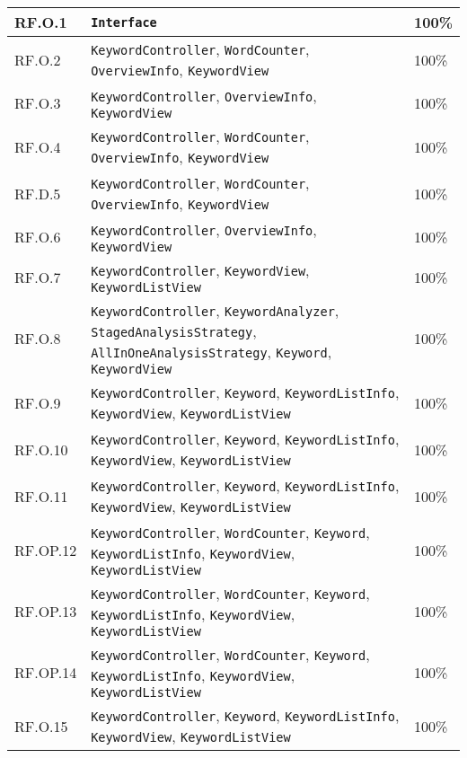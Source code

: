\begin{tabularx}{\textwidth}{l >{\raggedright\arraybackslash}X l}
  \hline
  RF.O.1 & \texttt{Interface} & 100\% \\
  \hline 
  RF.O.2 & \texttt{KeywordController}, \texttt{WordCounter}, \texttt{OverviewInfo}, \texttt{KeywordView} & 100\% \\
  \hline 
  RF.O.3 & \texttt{KeywordController}, \texttt{OverviewInfo}, \texttt{KeywordView} & 100\% \\
  \hline 
  RF.O.4 & \texttt{KeywordController}, \texttt{WordCounter}, \texttt{OverviewInfo}, \texttt{KeywordView} & 100\% \\
  \hline 
  RF.D.5 & \texttt{KeywordController}, \texttt{WordCounter}, \texttt{OverviewInfo}, \texttt{KeywordView} & 100\% \\
  \hline 
  RF.O.6 & \texttt{KeywordController}, \texttt{OverviewInfo}, \texttt{KeywordView} & 100\% \\
  \hline 
  RF.O.7 & \texttt{KeywordController}, \texttt{KeywordView}, \texttt{KeywordListView} & 100\% \\
  \hline 
  RF.O.8 & \texttt{KeywordController}, \texttt{KeywordAnalyzer}, \texttt{StagedAnalysisStrategy}, \texttt{AllInOneAnalysisStrategy}, \texttt{Keyword}, \texttt{KeywordView} & 100\% \\
  \hline 
  RF.O.9 & \texttt{KeywordController}, \texttt{Keyword}, \texttt{KeywordListInfo}, \texttt{KeywordView}, \texttt{KeywordListView} & 100\% \\
  \hline 
  RF.O.10 & \texttt{KeywordController}, \texttt{Keyword}, \texttt{KeywordListInfo}, \texttt{KeywordView}, \texttt{KeywordListView} & 100\% \\
  \hline 
  RF.O.11 & \texttt{KeywordController}, \texttt{Keyword}, \texttt{KeywordListInfo}, \texttt{KeywordView}, \texttt{KeywordListView} & 100\% \\
  \hline 
  RF.OP.12 & \texttt{KeywordController}, \texttt{WordCounter}, \texttt{Keyword}, \texttt{KeywordListInfo}, \texttt{KeywordView}, \texttt{KeywordListView} & 100\% \\
  \hline 
  RF.OP.13 & \texttt{KeywordController}, \texttt{WordCounter}, \texttt{Keyword}, \texttt{KeywordListInfo}, \texttt{KeywordView}, \texttt{KeywordListView} & 100\% \\
  \hline 
  RF.OP.14 & \texttt{KeywordController}, \texttt{WordCounter}, \texttt{Keyword}, \texttt{KeywordListInfo}, \texttt{KeywordView}, \texttt{KeywordListView} & 100\% \\
  \hline 
  RF.O.15 & \texttt{KeywordController}, \texttt{Keyword}, \texttt{KeywordListInfo}, \texttt{KeywordView}, \texttt{KeywordListView} & 100\% \\

\end{tabularx}
